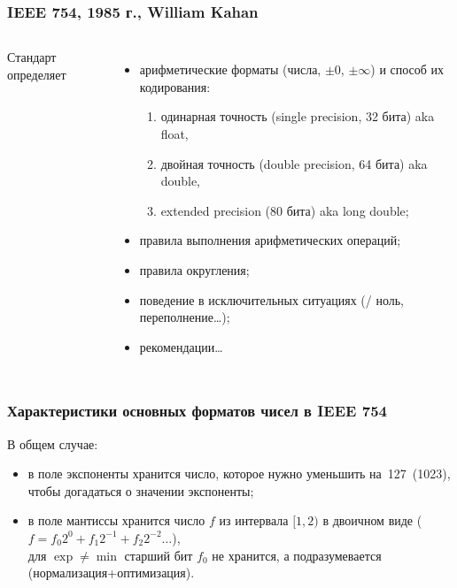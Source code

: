 \begin{frame}
\frametitle{IEEE 754, 1985 г., William Kahan}

\begin{columns}
    \column{7cm}

Стандарт определяет
\begin{itemize}[<+->]
    \item арифметические форматы (числа, $\pm 0$, $\pm \infty$) и способ их кодирования: %
{}

    \begin{enumerate}
        \item одинарная точность (single precision, 32 бита) aka float,
        \item двойная точность (double precision, 64 бита) aka double,
        \item extended precision (80 бита) aka long double;
    \end{enumerate}
    \item правила выполнения арифметических операций;
    \item правила округления;
    \item поведение в исключительных ситуациях (/ ноль, переполнение…);
    \item рекомендации…
\end{itemize}

    \column{5cm}

\end{columns}


\end{frame}

\begin{frame}[plain]
\frametitle{Характеристики основных форматов чисел в IEEE 754}
\vspace{-.3cm}\vspace{-.4cm}
\pause\small В общем случае:
\begin{itemize}
    \item \vspace{-.1cm} в поле экспоненты хранится число, которое нужно уменьшить на~127~(1023), чтобы догадаться о значении экспоненты;
    \pause\item \vspace{-.1cm} в поле мантиссы хранится число $f$ из интервала $[1,2)$ в двоичном виде ($f = f_0 2^0 + f_1 2^{-1} + f_2 2^{-2} \ldots$)\pause, \\ для $\exp\not = \min$ старший бит $f_0$ не хранится, а подразумевается (нормализация+оптимизация).
\end{itemize}
\end{frame}

